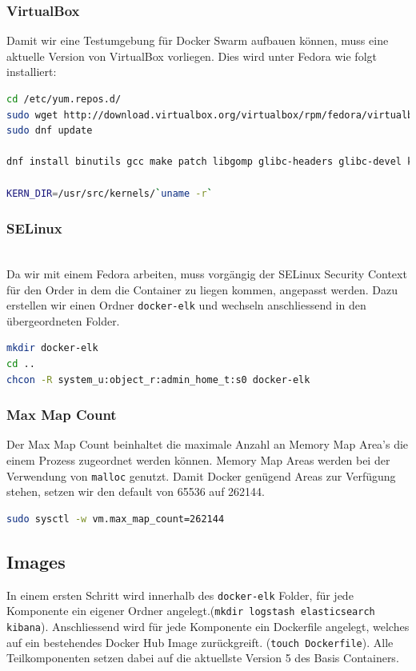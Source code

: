 \subsubsection{VirtualBox}
Damit wir eine Testumgebung für Docker Swarm aufbauen können, muss eine aktuelle Version von VirtualBox vorliegen.  Dies wird unter Fedora wie folgt installiert:
\begin{lstlisting}[language=bash]
cd /etc/yum.repos.d/ 
sudo wget http://download.virtualbox.org/virtualbox/rpm/fedora/virtualbox.repo
sudo dnf update

dnf install binutils gcc make patch libgomp glibc-headers glibc-devel kernel-headers kernel-devel dkms

KERN_DIR=/usr/src/kernels/`uname -r`
\end{lstlisting}


\subsubsection{SELinux} \hfill \\
Da wir mit einem Fedora arbeiten, muss vorgängig der SELinux Security Context für den Order in dem die Container zu liegen kommen, angepasst werden. Dazu erstellen wir einen Ordner \lstinline[]|docker-elk| und wechseln anschliessend in den übergeordneten Folder.
\begin{lstlisting}[language=bash]
mkdir docker-elk
cd ..
chcon -R system_u:object_r:admin_home_t:s0 docker-elk
\end{lstlisting}

\subsubsection{Max Map Count}
Der Max Map Count beinhaltet die maximale Anzahl an Memory Map Area's die einem Prozess zugeordnet werden können. Memory Map Areas werden bei der Verwendung von \lstinline[]|malloc| genutzt. Damit Docker genügend Areas zur Verfügung stehen, setzen wir den default von 65536 auf 262144.
\begin{lstlisting}[language=bash]
sudo sysctl -w vm.max_map_count=262144
\end{lstlisting}

\subsection{Images}
In einem ersten Schritt wird innerhalb des \lstinline[]|docker-elk| Folder, für jede Komponente ein eigener Ordner angelegt.(\lstinline[]|mkdir logstash elasticsearch kibana|). Anschliessend wird für jede Komponente ein Dockerfile angelegt, welches auf ein bestehendes Docker Hub Image zurückgreift. (\lstinline[]|touch Dockerfile|). Alle Teilkomponenten setzen dabei auf die aktuellste Version 5 des Basis Containers.


